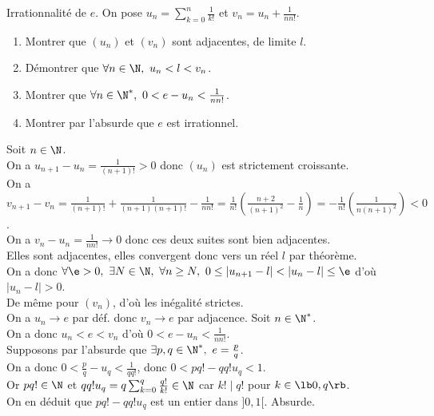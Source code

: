 \documentclass[11pt]{article}
\begin{document}


\thispagestyle{fancy}

\begin{exercice}{Irrationnalité de $e$.}{}
    On pose $u_n=\sum_{k=0}^n\frac{1}{k!}$ et $v_n=u_n+\frac{1}{nn!}$.
    \begin{enumerate}
        \item Montrer que $(u_n)$ et $(v_n)$ sont adjacentes, de limite $l$.
        \item Démontrer que $\forall n \in \N, ~ u_n < l < v_n$.
        \item Montrer que $\forall n \in \N^*, ~ 0 < e - u_n < \frac{1}{nn!}$.
        \item Montrer par l'absurde que $e$ est irrationnel.
    \end{enumerate}
    \tcblower
     Soit $n\in\N$.\\
    On a $u_{n+1}-u_n=\frac{1}{(n+1)!}>0$ donc $(u_n)$ est strictement croissante.\\
    On a $v_{n+1}-v_n=\frac{1}{(n+1)!}+\frac{1}{(n+1)(n+1)!}-\frac{1}{nn!}=\frac{1}{n!}\left(  \frac{n+2}{(n+1)^2}-\frac{1}{n} \right)=-\frac{1}{n!}\left( \frac{1}{n(n+1)^2} \right)<0$.\\
    On a $v_n-u_n=\frac{1}{nn!}\to0$ donc ces deux suites sont bien adjacentes.\\
     Elles sont adjacentes, elles convergent donc vers un réel $l$ par théorème.\\
    On a donc $\forall \e > 0, ~ \exists N \in \N, ~ \forall n \geq N, ~ 0\leq|u_{n+1}-l|<|u_n-l|\leq\e$ d'où $|u_n-l|>0$.\\
    De même pour $(v_n)$, d'où les inégalité strictes.\\
     On a $u_n\to e$ par déf. donc $v_n\to e$ par adjacence. Soit $n\in\N^*$.\\
    On a donc $u_n < e < v_n$ d'où $0 < e - u_n < \frac{1}{nn!}$.\\
     Supposons par l'absurde que $\exists p,q\in\N^*, ~ e = \frac{p}{q}$.\\
    On a donc $0<\frac{p}{q}-u_q<\frac{1}{qq!}$, donc $0<pq!-qq!u_q<1$.\\
    Or $pq!\in\N$ et $qq!u_q=q\sum_{k=0}^q\frac{q!}{k!}\in\N$ car $k!\mid q!$ pour $k\in\lb0,q\rb$.\\
    On en déduit que $pq!-qq!u_q$ est un entier dans $]0,1[$. Absurde.  
\end{exercice}
\end{document}
